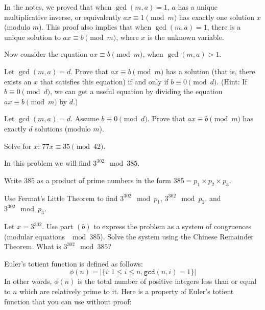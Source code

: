 
In the notes, we proved that when $\gcd(m, a) = 1$, $a$ has a unique multiplicative inverse, or equivalently $ax \equiv 1\pmod m$ has exactly one solution $x$ (modulo $m$).
This proof also implies that when $\gcd(m, a) = 1$, there is a unique solution to $ax \equiv b\pmod m$, where $x$ is the unknown variable.

Now consider the equation $ax \equiv b\pmod m$, when $\gcd(m, a)>1$.

\begin{Parts}

	\Part Let $\gcd(m, a) = d$.
	Prove that $ax \equiv b\pmod m$ has a solution (that is, there exists an $x$ that satisfies this equation) if and only if $b\equiv0\pmod d$. (Hint: If $b \equiv 0 \pmod d$, we can get a useful equation by dividing the equation $ax \equiv b \pmod m$ by $d$.)

	\Part Let $\gcd(m, a) = d$.
	Assume $b \equiv 0\pmod d$.
	Prove that $ax \equiv b\pmod m$ has exactly $d$ solutions (modulo $m$).

    \Part Solve for $x$: $77x \equiv 35 \pmod{42}$.

\end{Parts}
\newpage



In this problem we will find $3^{302} \mod{385}$.

\begin{Parts}

\Part
Write $385$ as a product of prime numbers in the form $385=p_1\times p_2 \times p_3$.


\Part
Use Fermat's Little Theorem to find $3^{302} \mod{p_1}$, $3^{302} \mod{p_2}$, and $3^{302}\mod{p_3}$.

\Part
Let $x=3^{302}$. Use part $(b)$ to express the problem as a system of congruences (modular equations $\mod{385}$). Solve the system using the Chinese Remainder Theorem. What is $3^{302}\mod{385}$?

\end{Parts}



  Euler's totient function is defined as follows:
  $$\phi(n) = | \{i: 1 \leq i \leq n, \texttt{gcd}(n,i) = 1\} |$$
  In other words, $\phi(n)$ is the total number of positive integers less than or equal to $n$ which are relatively prime to it.
  Here is a property of Euler's totient function that you can use without proof:

